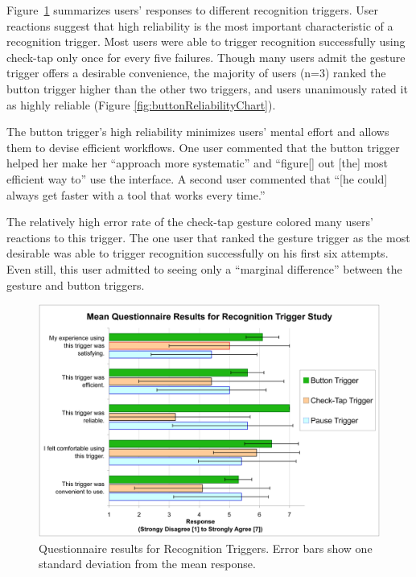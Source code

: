 \documentclass{elsart}
\begin{document}
Figure~\ref{fig:qResultsTriggers} summarizes users' responses to
different recognition triggers.  User reactions suggest that high
reliability is the most important characteristic of a recognition
trigger.  Most users were able to trigger recognition successfully
using check-tap only once for every five failures. Though many users
admit the gesture trigger offers a desirable convenience, the majority
of users (n=3) ranked the button trigger higher than the other two
triggers, and users unanimously rated it as highly reliable (Figure
\ref{fig:buttonReliabilityChart}).

The button trigger's high reliability minimizes users' mental effort
and allows them to devise efficient workflows.  One user commented
that the button trigger helped her make her ``approach more
systematic'' and ``figure[] out [the] most efficient way to'' use the
interface.  A second user commented that ``[he could] always get
faster with a tool that works every time.''

The relatively high error rate of the check-tap gesture colored many
users' reactions to this trigger.  The one user that ranked the
gesture trigger as the most desirable was able to trigger recognition
successfully on his first six attempts.  Even still, this user
admitted to seeing only a ``marginal difference'' between the gesture
and button triggers.

\begin{figure}[tb]
  \centering
  \includegraphics[width=.9\linewidth]{QuestionnaireResultsRecognitionTrigger.png}
  \caption{\label{fig:qResultsTriggers} Questionnaire results for
           Recognition Triggers. Error bars show one standard
           deviation from the mean response. }
\end{figure}
\end{document}
